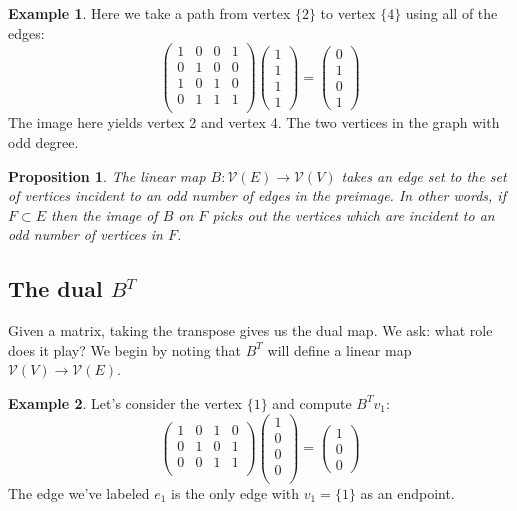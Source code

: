 \documentclass[10pt, letterpaper]{article}
\newtheorem{prop}{Proposition}
\theoremstyle{remark}
\theoremstyle{definition}
\newtheorem{ex}{Example}
\begin{document}
\begin{ex}
 Here we take a path from vertex $\{2\}$ to vertex $\{4\}$ using all of the edges:
 \[
 	\begin{pmatrix}
		1 & 0 & 0 & 1 \\
		0 & 1 & 0 & 0 \\
		1 & 0 & 1 & 0 \\
		0 & 1 & 1 & 1 \\
	\end{pmatrix}
	\begin{pmatrix}
		1 \\ 1 \\ 1 \\ 1
	\end{pmatrix} = 
	\begin{pmatrix}
		0 \\ 1 \\ 0 \\ 1
	\end{pmatrix}
 \]
 The image here yields vertex 2 and vertex 4. The two vertices in the graph with odd degree.
\end{ex}

\begin{prop}
	The linear map $B: \mathcal{V}(E) \rightarrow \mathcal{V}(V)$ takes an edge set to the set of vertices incident to an odd number of edges in the preimage. In other words, if $F \subset E$ then the image of $B$ on $F$ picks out the vertices which are incident to an odd number of vertices in $F$.
\end{prop}

\subsection{The dual $B^T$}
Given a matrix, taking the transpose gives us the dual map. We ask: what role does it play? We begin by noting that $B^T$ will define a linear map $\mathcal{V}(V) \rightarrow \mathcal{V}(E)$.

\begin{ex}
	Let's consider the vertex $\{1\}$ and compute $B^Tv_1$:
	\[
		\begin{pmatrix}
			1 & 0 & 1 & 0 \\
			0 & 1 & 0 & 1 \\
			0 & 0 & 1 & 1 \\
		\end{pmatrix}
		\begin{pmatrix}
			1 \\ 0  \\  0  \\ 0 \\
		\end{pmatrix} = 
		\begin{pmatrix}
			1 \\ 0 \\ 0 
		\end{pmatrix}
	\]
	The edge we've labeled $e_1$ is the only edge with $v_1=\{1\}$ as an endpoint.
\end{ex}
\end{document}
